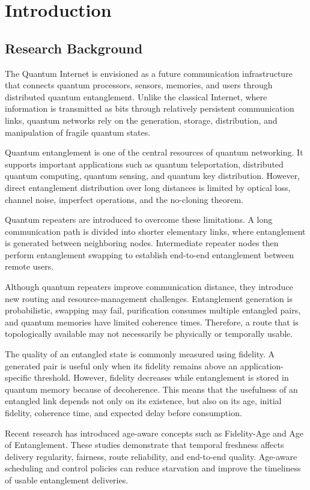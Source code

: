 \chapter{Introduction}

\section{Research Background}
The Quantum Internet is envisioned as a future communication infrastructure that connects quantum processors, sensors, memories, and users through distributed quantum entanglement. Unlike the classical Internet, where information is transmitted as bits through relatively persistent communication links, quantum networks rely on the generation, storage, distribution, and manipulation of fragile quantum states.

Quantum entanglement is one of the central resources of quantum networking. It supports important applications such as quantum teleportation, distributed quantum computing, quantum sensing, and quantum key distribution. However, direct entanglement distribution over long distances is limited by optical loss, channel noise, imperfect operations, and the no-cloning theorem.

Quantum repeaters are introduced to overcome these limitations. A long communication path is divided into shorter elementary links, where entanglement is generated between neighboring nodes. Intermediate repeater nodes then perform entanglement swapping to establish end-to-end entanglement between remote users.

Although quantum repeaters improve communication distance, they introduce new routing and resource-management challenges. Entanglement generation is probabilistic, swapping may fail, purification consumes multiple entangled pairs, and quantum memories have limited coherence times. Therefore, a route that is topologically available may not necessarily be physically or temporally usable.

The quality of an entangled state is commonly measured using fidelity. A generated pair is useful only when its fidelity remains above an application-specific threshold. However, fidelity decreases while entanglement is stored in quantum memory because of decoherence. This means that the usefulness of an entangled link depends not only on its existence, but also on its age, initial fidelity, coherence time, and expected delay before consumption.

Recent research has introduced age-aware concepts such as Fidelity-Age and Age of Entanglement. These studies demonstrate that temporal freshness affects delivery regularity, fairness, route reliability, and end-to-end quality. Age-aware scheduling and control policies can reduce starvation and improve the timeliness of usable entanglement deliveries.

